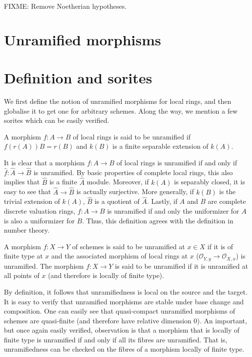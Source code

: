 \medskip\noindent
FIXME: Remove Noetherian hypotheses.

\section{Unramified morphisms}
\label{section-unramified}

\section{Definition and sorites}
\label{section-unramified-definition}

\noindent
We first define the notion of unramified morphisms for local rings, and then
globalise it to get one for arbitrary schemes. Along the way, we mention a few
sorites which can be easily verified.

\begin{definition}
\label{definition-unramified-rings}
A morphism $f:A \to B$ of local rings is said to be unramified if
$f(r(A))B = r(B)$ and $k(B)$ is a finite separable extension of $k(A)$. 
\end{definition}

\noindent
It is clear that a morphism $f:A \to B$ of local rings is unramified if and
only if $\widehat{f}:\widehat{A} \to \widehat{B}$ is unramified. By basic
properties of complete local rings, this also implies that $\widehat{B}$ is a
finite $\widehat{A}$ module. Moreover, if $k(A)$ is separably closed, it is
easy to see that $\widehat{A} \to \widehat{B}$ is actually surjective. More
generally, if $k(B)$ is the trivial extension of $k(A)$, $\widehat{B}$ is a
quotient of $\widehat{A}$. Lastly, if $A$ and $B$ are complete discrete
valuation rings, $f:A \to B$ is unramified if and only the uniformizer for
$A$ is also a uniformizer for $B$. Thus, this definition agrees with the
definition in number theory.

\begin{definition}
\label{definition-unramified-schemes}
A morphism $f:X \to Y$ of schemes is said to be unramified at $x \in X$ if it
is of finite type at $x$ and the associated morphism of local rings at $x$
($\mathcal{O}_{Y,y} \to \mathcal{O}_{X,x}$) is unramified. The morphism $f:X 
\to Y$ is said to
be unramified if it is unramified at all points of $x$ (and therefore is
locally of finite type).
\end{definition}

\noindent
By definition, it follows that unramifiedness is local on the source and the
target. It is easy to verify that unramified morphisms are stable under
base change and composition. One can easily see that quasi-compact unramified
morphisms of schemes are quasi-finite (and therefore have relative dimension
$0$). An important, but once again easily verified, observation is that a
morphism that is locally of finite type is unramified if and only if all its
fibres are unramified. That is, unramifiedness can be checked on the fibres
of a morphism locally of finite type.

